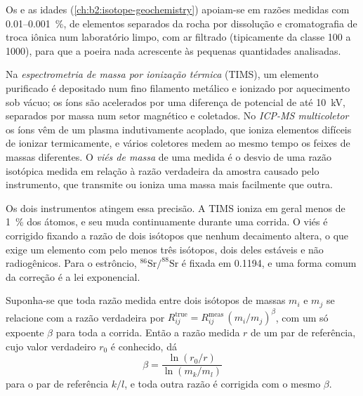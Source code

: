 Os  e as idades (\cref{ch:b2:isotope-geochemistry}) apoiam-se em razões medidas
com 0.01--\qty{0.001}{\percent}, de elementos separados da rocha por dissolução
e cromatografia de troca iônica num laboratório limpo, com ar filtrado (tipicamente da classe 100 a
1000), para que a poeira nada acrescente às pequenas quantidades analisadas.

\begin{definition}\label{def:b2:field-lab-methods-2:tims}
Na \emph{espectrometria de massa por ionização térmica} (TIMS), um
elemento purificado é depositado num fino filamento metálico e ionizado por aquecimento sob vácuo; os íons
são acelerados por uma diferença de potencial de até \qty{10}{kV}, separados por massa num setor magnético
e coletados. No \emph{ICP-MS multicoletor} os íons vêm de um
plasma indutivamente acoplado, que ioniza elementos difíceis de ionizar termicamente, e vários
coletores medem ao mesmo tempo os feixes de massas diferentes. O \emph{viés de
massa} de uma medida é o desvio de uma razão isotópica medida em relação à razão
verdadeira da amostra causado pelo instrumento, que transmite ou ioniza uma massa mais facilmente que
outra.
\end{definition}

Os dois instrumentos atingem essa precisão. A TIMS ioniza em geral menos de
\qty{1}{\percent} dos átomos, e seu  muda continuamente durante uma corrida. O viés é corrigido fixando a razão de dois isótopos que nenhum
decaimento altera, o que exige um elemento com pelo menos três isótopos, dois deles estáveis e não
radiogênicos. Para o estrôncio, $^{86}\mathrm{Sr}/^{88}\mathrm{Sr}$ é fixada em 0.1194, e uma forma
comum da correção é a lei exponencial.

\begin{proposition}\label{prop:b2:field-lab-methods-2:bias}
Suponha-se que toda razão medida entre dois isótopos de massas $m_i$ e $m_j$ se relacione com a razão verdadeira
por $R_{ij}^{\mathrm{true}} = R_{ij}^{\mathrm{meas}}\,(m_i/m_j)^{\beta}$, com um só expoente
$\beta$ para toda a corrida. Então a razão medida $r$ de um par de referência, cujo valor verdadeiro
$r_0$ é conhecido, dá
\begin{equation}
\beta = \frac{\ln(r_0/r)}{\ln(m_k/m_l)}
\label{eq:b2:field-lab-methods-2:beta}
\end{equation}
para o par de referência $k/l$, e toda outra razão é corrigida com o mesmo $\beta$.
\end{proposition}

